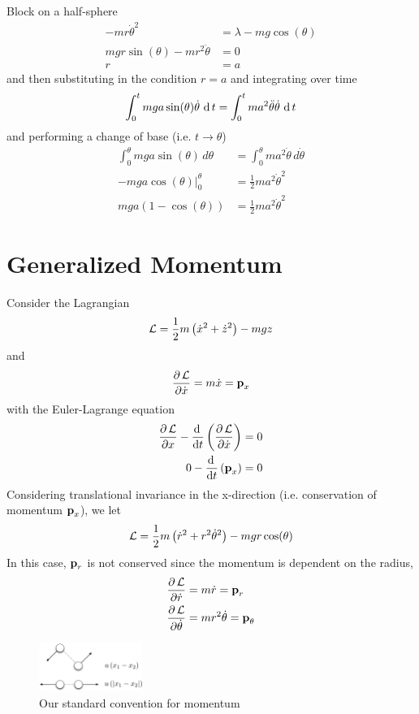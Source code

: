 \documentclass[11pt]{article}
\begin{document}
\begin{example}{Block on a half-sphere}
\begin{align*}
  -mr\dot{\theta}^2 &= \lambda - mg\cos(\theta)\\
  mgr\sin(\theta) - mr^2 \ddot{\theta} &= 0\\
  r &= a
\end{align*}
and then substituting in the condition $r=a$ and integrating over time
\[ \int_0^t mga \sin(\theta) \dot{\theta} \, \, \mathrm{d}\,t = \int_0^t ma^2 \ddot{\theta} \dot{\theta} \, \, \mathrm{d}\,t \]
and performing a change of base (i.e. $t \to \theta$)
\begin{align*}
  \int_0^\theta mga \sin(\theta)\, d\theta &= \int_0^\theta ma^2 \dot{\theta}\, d\dot{\theta}\\
  -mga\cos(\theta)\Big|_0^{\theta} &= \frac{1}{2} ma^2\dot{\theta}^2\\
  mga(1-\cos(\theta)) &= \frac{1}{2} ma^2 \dot{\theta}^2
\end{align*}
\end{example}

\section{Generalized Momentum}
Consider the Lagrangian
\begin{equation} \mathcal{L} = \frac{1}{2} m \left(\dot{x}^2 + \dot{z}^2 \right) - mgz \end{equation}
and
\[ \frac{\partial\, \mathcal{L}}{\partial \dot{x}} = m\dot{x} = \textbf{p}_x \]
with the Euler-Lagrange equation
\begin{align*}
  \frac{\partial\, \mathcal{L}}{\partial x} - \frac{\mathrm{d}\, }{\mathrm{d} t} \left(\frac{\partial\, \mathcal{L}}{\partial \dot{x}} \right) &= 0\\
  0 - \frac{\mathrm{d}\, }{\mathrm{d} t} \left(\textbf{p}_x \right) &= 0
\end{align*}
Considering translational invariance in the x-direction (i.e. conservation of momentum $\textbf{p}_x$), we let
\[ \mathcal{L} = \frac{1}{2}m \left(\dot{r}^2 + r^2 \dot{\theta}^2 \right) - mgr\cos(\theta) \]
In this case, $\textbf{p}_r$ is not conserved since the momentum is dependent on the radius,
\begin{align*}
  \frac{\partial\, \mathcal{L}}{\partial \dot{r}} &= m\dot{r} = \textbf{p}_r\\
  \frac{\partial\, \mathcal{L}}{\partial \dot{\theta}} &= mr^2 \dot{\theta} = \textbf{p}_\theta
\end{align*}

\begin{figure}[ht!]
\centering
\includegraphics[width=0.3\textwidth]{fig2.pdf}
\caption{Our standard convention for momentum}
\label{fig:momentum}
\end{figure}
\end{document}
